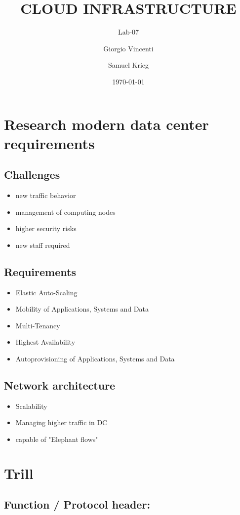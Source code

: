 \documentclass[a4,12pt]{scrartcl}
\title{CLOUD INFRASTRUCTURE}
\subtitle{Lab-07}
\author{Giorgio Vincenti \and Samuel Krieg}
\date{\today}
\begin{document}
\clearpage\maketitle
\thispagestyle{empty}
\tableofcontents
\newpage

\section{Research modern data center requirements}
\subsection{Challenges}
\begin{itemize}
\item new traffic behavior
\item management of computing nodes
\item higher security risks
\item new staff required
\end{itemize}

\subsection{Requirements}
\begin{itemize}
\item Elastic Auto-Scaling
\item Mobility of Applications, Systems and Data
\item Multi-Tenancy
\item Highest Availability
\item Autoprovisioning of Applications, Systems and Data
\end{itemize}

\subsection{Network architecture}
\begin{itemize}
\item Scalability
\item Managing higher traffic in DC
\item capable of "Elephant flows"
\end{itemize}

\section{Trill}
\subsection{Function / Protocol header:} 
\end{document}
